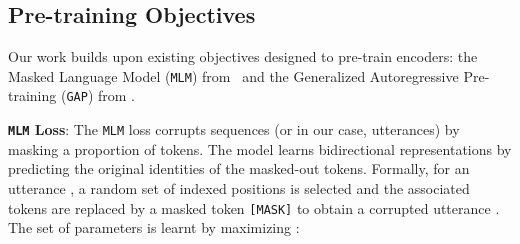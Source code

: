 \documentclass[11pt,a4paper]{article}
\begin{document}
\begin{table}[!htb]\label{tab:kysymys}
\centering
{}
\caption{Examples of dialogs labelled with \texttt{DA} taken from \texttt{SwDA}. The labels  \texttt{qw}, \texttt{sd}, \texttt{b}, \texttt{bk} respectively correspond to wh-question, statement-non-opinion, backchannel and response acknowledgement.}
\label{tab:comp_ex}
\end{table}


\subsection{Pre-training Objectives}\label{ssec:notations}
Our work builds upon existing objectives designed to pre-train encoders: the Masked Language Model (\texttt{MLM}) from~\citet{bert,roberta,albert,zhang2019hibert} and the Generalized Autoregressive Pre-training (\texttt{GAP}) from \citet{xlnet}.


\noindent\textbf{\texttt{MLM} Loss}: The \texttt{MLM} loss corrupts sequences (or in our case, utterances) by masking a proportion  of tokens. The model learns bidirectional representations by predicting the original identities of the masked-out tokens. Formally, for an utterance , a random set of indexed positions  is selected and the associated tokens are replaced by a masked token \texttt{[MASK]} to obtain a corrupted utterance . The set of parameters  is learnt by maximizing : 
 
\end{document}

